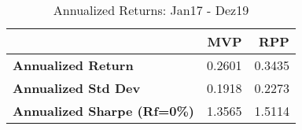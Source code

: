 \begin{table}
      \centering
      \begingroup
      \fontsize{9}{9}
      \selectfont 
\begin{tabular}{>{}lrr}
\toprule
  & MVP & RPP\\
\midrule
\textbf{Annualized Return} & 0.2601 & 0.3435\\
\textbf{Annualized Std Dev} & 0.1918 & 0.2273\\
\textbf{Annualized Sharpe (Rf=0\%)} & 1.3565 & 1.5114\\
\bottomrule
\end{tabular} \caption{Annualized Returns: Jan17 - Dez19}
      \label{tab: Low101 }  
      \endgroup{}
      \end{table}